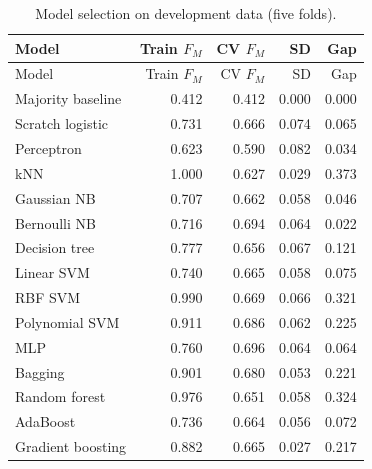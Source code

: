 \begin{longtable}{@{}p{3.6cm}rrrr@{}}
\caption{Model selection on development data (five folds).}\label{tab:cv}\\
\toprule
Model & Train $F_M$ & CV $F_M$ & SD & Gap \\
\midrule\endfirsthead
\toprule
Model & Train $F_M$ & CV $F_M$ & SD & Gap \\
\midrule\endhead
\bottomrule\endfoot
Majority baseline & 0.412 & 0.412 & 0.000 & 0.000 \\
Scratch logistic & 0.731 & 0.666 & 0.074 & 0.065 \\
Perceptron & 0.623 & 0.590 & 0.082 & 0.034 \\
kNN & 1.000 & 0.627 & 0.029 & 0.373 \\
Gaussian NB & 0.707 & 0.662 & 0.058 & 0.046 \\
Bernoulli NB & 0.716 & 0.694 & 0.064 & 0.022 \\
Decision tree & 0.777 & 0.656 & 0.067 & 0.121 \\
Linear SVM & 0.740 & 0.665 & 0.058 & 0.075 \\
RBF SVM & 0.990 & 0.669 & 0.066 & 0.321 \\
Polynomial SVM & 0.911 & 0.686 & 0.062 & 0.225 \\
MLP & 0.760 & 0.696 & 0.064 & 0.064 \\
Bagging & 0.901 & 0.680 & 0.053 & 0.221 \\
Random forest & 0.976 & 0.651 & 0.058 & 0.324 \\
AdaBoost & 0.736 & 0.664 & 0.056 & 0.072 \\
Gradient boosting & 0.882 & 0.665 & 0.027 & 0.217 \\
\end{longtable}
